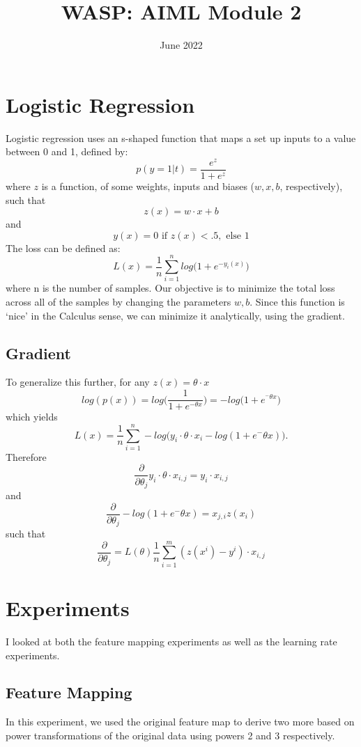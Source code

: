 \documentclass{article}
\title{WASP: AIML Module 2}
\date{June 2022}
\begin{document}
\maketitle

\section{Logistic Regression}
Logistic regression uses an s-shaped function that maps a set up inputs to a value between 0 and 1, defined by:
$$
p(y = 1| t) =  \frac{e^z}{1 + e^z}
$$
where $z$ is a function, of some weights, inputs and biases ($ w, x, b$, respectively), such that
$$
z(x) = w \cdot x + b
$$
and 
$$
y(x) = 0 \textrm{ if } z(x) < .5, \textrm{ else } 1
$$
The loss can be defined as:
$$
L(x) = \frac{1}{n} \sum_{i = 1}^n log \bigg( 1 + e ^{-y_i(x)} \bigg)
$$
where n is the number of samples. Our objective is to minimize the total loss across all of the samples by changing the parameters $w, b$. Since this function is `nice' in the Calculus sense, we can minimize it analytically, using the gradient.

\subsection{Gradient}

To generalize this further, for any $z(x) = \theta \cdot x$
$$
log(p(x)) = log \bigg( \frac{1}{1+e^{-\theta x}} \bigg)= -log \bigg( 1 + e^{^-\theta x} \bigg)
$$
which yields
$$
L(x) = \frac{1}{n} \sum_{i = 1}^n -log \bigg( y_i \cdot \theta \cdot  x_i -log(1 + e ^-\theta x)  \bigg).
$$
Therefore
$$
\frac{\partial}{\partial \theta_j} y_i \cdot \theta \cdot x_{i,j} = y_i \cdot x_{i,j}
$$
and 
$$
\frac{\partial}{\partial \theta_j} -log(1 + e ^-\theta x)  = x_{j,i}z(x_i)
$$
such that
$$
\frac{\partial}{\partial \theta_j} = L(\theta) \frac{1}{n} \sum_{i = 1}^m(z(x^i) - y^i) \cdot x_{i,j}
$$

\section{Experiments}
I looked at both the feature mapping experiments as well as the learning rate experiments. 

\subsection{Feature Mapping}
In this experiment, we used the original feature map to derive two more based on power transformations of the original data using powers 2 and 3 respectively.
\end{document}
